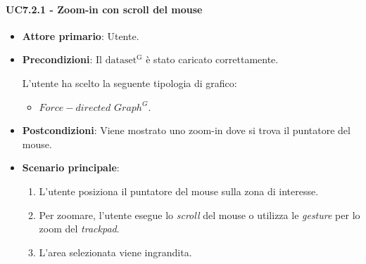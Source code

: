 \paragraph{UC7.2.1 - Zoom-in con scroll del mouse}
\label{sec:UC7.2.1}
\begin{itemize}
    \item \textbf{Attore primario}: Utente.
    \item \textbf{Precondizioni}: Il ${\mathrm{dataset^{G}}}$ è stato caricato correttamente. \par L'utente ha scelto la seguente tipologia di grafico:
    \begin{itemize}
          \item $Force-directed$ $Graph^{G}$.
    \end{itemize}
    \item \textbf{Postcondizioni}: Viene mostrato uno zoom-in dove si trova il puntatore del mouse.
    \item \textbf{Scenario principale}:
          \begin{enumerate}
              \item L'utente posiziona il puntatore del mouse sulla zona di interesse.
              \item Per zoomare, l'utente esegue lo \textit{scroll} del mouse o utilizza le \textit{gesture} per lo zoom del \textit{trackpad}.
              \item L'area selezionata viene ingrandita.
          \end{enumerate}
\end{itemize}

